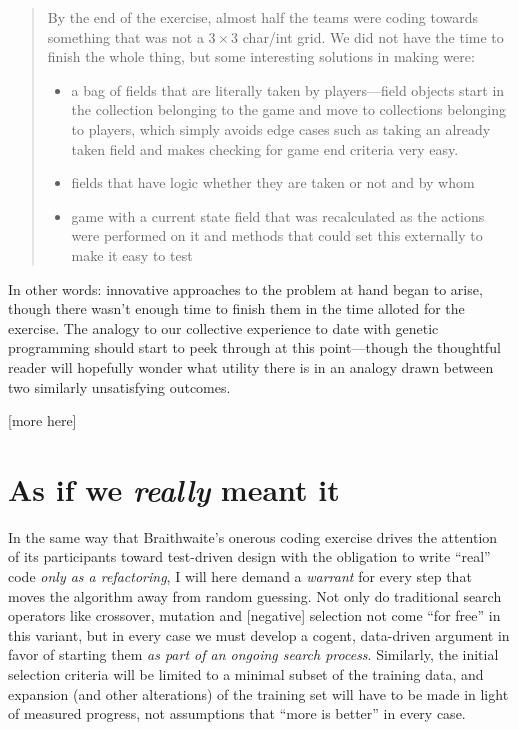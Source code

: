 \begin{quotation}
By the end of the exercise, almost half the teams were coding towards something that was not a $3\times 3$ char/int grid. We did not have the time to finish the whole thing, but some interesting solutions in making were:

\begin{itemize}
\item a bag of fields that are literally taken by players---field objects start in the collection belonging to the game and move to collections belonging to players, which simply avoids edge cases such as taking an already taken field and makes checking for game end criteria very easy.
\item fields that have logic whether they are taken or not and by whom
\item game with a current state field that was recalculated as the actions were performed on it and methods that could set this externally to make it easy to test
\end{itemize}
\end{quotation}

In other words: innovative approaches to the problem at hand began to arise, though there wasn't enough time to finish them in the time alloted for the exercise. The analogy to our collective experience to date with genetic programming should start to peek through at this point---though the thoughtful reader will hopefully wonder what utility there is in an analogy drawn between two similarly unsatisfying outcomes.

[more here]

\section{As if we \emph{really} meant it}\hypertarget{as-if-we-really-meant-it}{}\label{as-if-we-really-meant-it}

In the same way that Braithwaite's onerous coding exercise drives the attention of its participants toward test-driven design with the obligation to write ``real'' code \emph{only as a refactoring}, I will here demand a \emph{warrant} for every step that moves the algorithm away from random guessing. Not only do traditional search operators like crossover, mutation and [negative] selection not come ``for free'' in this variant, but in every case we must develop a cogent, data-driven argument in favor of starting them \emph{as part of an ongoing search process}. Similarly, the initial selection criteria will be limited to a minimal subset of the training data, and expansion (and other alterations) of the training set will have to be made in light of measured progress, not assumptions that ``more is better'' in every case.

